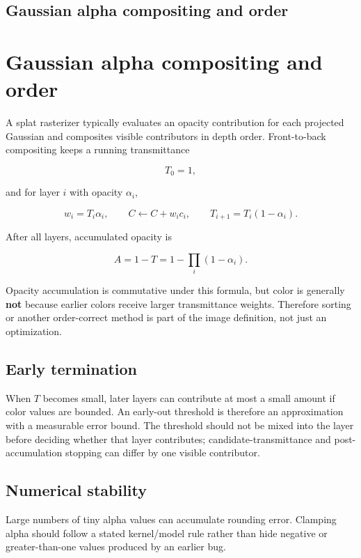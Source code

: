 \hypertarget{appendix-5f4b2e24c3f6}{}
\section*{Gaussian alpha compositing and order}
\chapter{Gaussian alpha compositing and order}\label{appendix-5f4b2e24c3f6-gaussian-alpha-compositing-and-order}

A splat rasterizer typically evaluates an opacity contribution for each projected Gaussian and composites visible contributors in depth order. Front-to-back compositing keeps a running transmittance

\[
T_0=1,
\]

and for layer \(i\) with opacity \(\alpha_i\),

\[
w_i=T_i\alpha_i,
\qquad
C \leftarrow C+w_i c_i,
\qquad
T_{i+1}=T_i(1-\alpha_i).
\]

After all layers, accumulated opacity is

\[
A=1-T
=
1-\prod_i(1-\alpha_i).
\]

Opacity accumulation is commutative under this formula, but color is generally \textbf{not} because earlier colors receive larger transmittance weights. Therefore sorting or another order-correct method is part of the image definition, not just an optimization.

\section{Early termination}\label{appendix-5f4b2e24c3f6-early-termination}

When \(T\) becomes small, later layers can contribute at most a small amount if color values are bounded. An early-out threshold is therefore an approximation with a measurable error bound. The threshold should not be mixed into the layer before deciding whether that layer contributes; candidate-transmittance and post-accumulation stopping can differ by one visible contributor.

\section{Numerical stability}\label{appendix-5f4b2e24c3f6-numerical-stability}

Large numbers of tiny alpha values can accumulate rounding error. Clamping alpha should follow a stated kernel/model rule rather than hide negative or greater-than-one values produced by an earlier bug.

